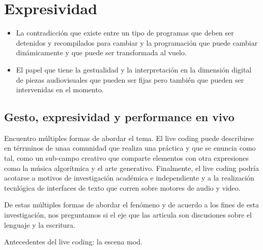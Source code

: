 \chapter{Expresividad}




\begin{itemize}
\item La contradicción que existe entre un tipo de programas que deben ser detenidos y recompilados para cambiar y la programación que puede cambiar dinámicamente y que puede ser transformada al vuelo. 
\item El papel que tiene la gestualidad y la interpretación en la dimensión digital de piezas audiovisuales que pueden ser fijas pero también que pueden ser intervenidas en el momento. 
\end{itemize}


\section{Gesto, expresividad y performance en vivo} 



Encuentro múltiples formas de abordar el tema. El live coding puede describirse en térrminos de unaa comunidad que realiza una práctica y que se enuncia como tal, como un sub-campo creativo que comparte elementos con otra expresiones como la música algorítmica y el arte generativo. Finalmente, el live coding podría acotarse a motivos de investigación académica e independiente y a la realización tecnlógica de interfaces de texto que corren sobre motores de audio y video.

De estas múltiples formas de abordar el fenómeno y de acuerdo a los fines de esta investigación, nos preguntamos si el eje que las articula son discusiones sobre el lenguaje y la escritura. 


Antecedentes del live coding: la escena mod.

